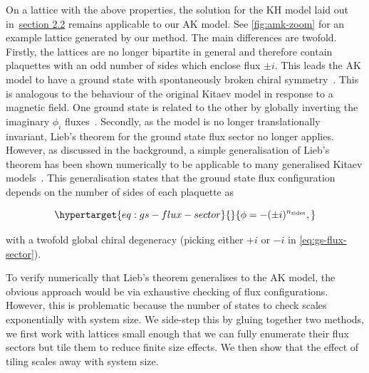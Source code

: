 On a lattice with the above properties, the solution for the KH model laid out in~\protect\hyperlink{bg-hkm-model}{section 2.2} remains applicable to our AK model. See \cref{fig:amk-zoom} for an example lattice generated by our method. The main differences are twofold. Firstly, the lattices are no longer bipartite in general and therefore contain plaquettes with an odd number of sides which enclose flux \(\pm i\). This leads the AK model to have a ground state with spontaneously broken chiral symmetry~\autocite{Chua2011,yaoExactChiralSpin2007,ChuaPRB2011,Fiete2012,Natori2016,Wu2009,Peri2020,WangHaoranPRB2021}. This is analogous to the behaviour of the original Kitaev model in response to a magnetic field. One ground state is related to the other by globally inverting the imaginary \(\phi_i\) fluxes~\autocite{yaoExactChiralSpin2007}. Secondly, as the model is no longer translationally invariant, Lieb's theorem for the ground state flux sector no longer applies. However, as discussed in the background, a simple generalisation of Lieb's theorem has been shown numerically to be applicable to many generalised Kitaev models~\autocite{eschmannThermodynamicClassificationThreedimensional2020,Yao2009,eschmann2019thermodynamics,Peri2020}. This generalisation states that the ground state flux configuration depends on the number of sides of each plaquette as

\begin{equation}\protect\hypertarget{eq:gs-flux-sector}{}{\phi = -(\pm i)^{n_{\mathrm{sides}}},}\label{eq:gs-flux-sector}\end{equation}

with a twofold global chiral degeneracy (picking either \(+i\) or \(-i\) in \cref{eq:gs-flux-sector}).

To verify numerically that Lieb's theorem generalises to the AK model, the obvious approach would be via exhaustive checking of flux configurations. However, this is problematic because the number of states to check scales exponentially with system size. We side-step this by gluing together two methods, we first work with lattices small enough that we can fully enumerate their flux sectors but tile them to reduce finite size effects. We then show that the effect of tiling scales away with system size.

